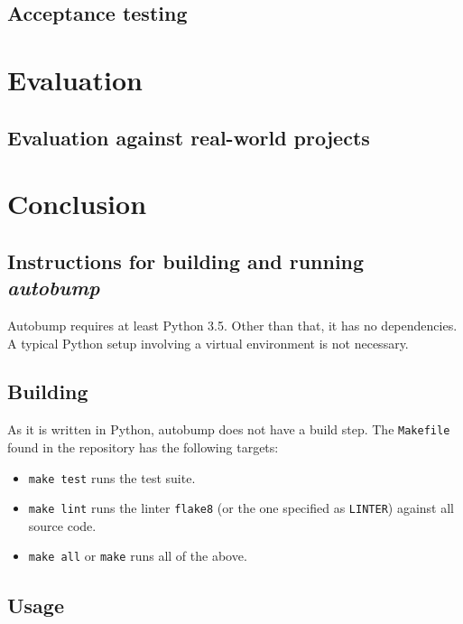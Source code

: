 \documentclass{l4proj}
\begin{document}
\section{Acceptance testing}

\chapter{Evaluation}


\section{Evaluation against real-world projects}


\chapter{Conclusion}

\begin{appendices}

\chapter{Instructions for building and running \textit{autobump}}

Autobump requires at least Python 3.5. Other than that, it has no
dependencies. A typical Python setup involving a virtual environment
is not necessary.

\section{Building}

As it is written in Python, autobump does not have a build step. The
\texttt{Makefile} found in the repository has the following targets:

\begin{itemize}
\item \texttt{make test} runs the test suite.
\item \texttt{make lint} runs the linter \texttt{flake8} (or the one
specified as \texttt{LINTER}) against all source code.
\item \texttt{make all} or \texttt{make} runs all of the above.
\end{itemize}

\section{Usage}

\end{appendices}



\end{document}
